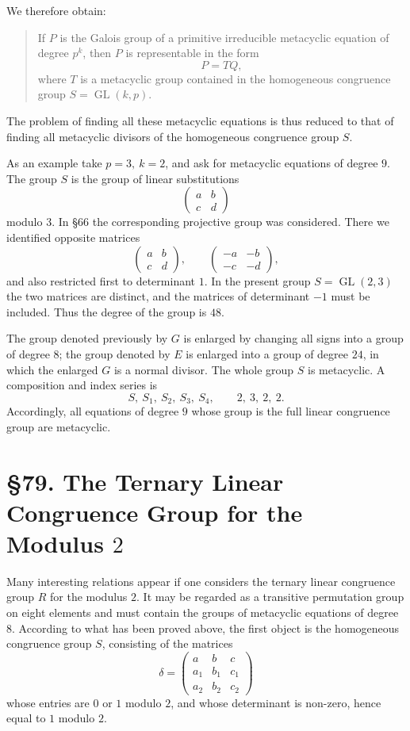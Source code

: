 \documentclass[11pt,a4paper]{book}
\newcommand{\webersection}[2]{\clearpage\section*{\S #1. #2}}
\DeclareMathOperator{\GL}{GL}
\begin{document}
We therefore obtain:

\begin{quote}
If \(P\) is the Galois group of a primitive irreducible metacyclic equation of degree \(p^k\), then \(P\) is representable in the form
\[
 P=TQ,
\]
where \(T\) is a metacyclic group contained in the homogeneous congruence group \(S=\GL(k,p)\).
\end{quote}

The problem of finding all these metacyclic equations is thus reduced to that of finding all metacyclic divisors of the homogeneous congruence group \(S\).

As an example take \(p=3,\ k=2\), and ask for metacyclic equations of degree \(9\).  The group \(S\) is the group of linear substitutions
\[
 \begin{pmatrix}a&b\\ c&d\end{pmatrix}
\]
modulo \(3\).  In \S 66 the corresponding projective group was considered.  There we identified opposite matrices
\[
 \begin{pmatrix}a&b\\ c&d\end{pmatrix},
 \qquad
 \begin{pmatrix}-a&-b\\ -c&-d\end{pmatrix},
\]
and also restricted first to determinant \(1\).  In the present group \(S=\GL(2,3)\) the two matrices are distinct, and the matrices of determinant \(-1\) must be included.  Thus the degree of the group is \(48\).

The group denoted previously by \(G\) is enlarged by changing all signs into a group of degree \(8\); the group denoted by \(E\) is enlarged into a group of degree \(24\), in which the enlarged \(G\) is a normal divisor.  The whole group \(S\) is metacyclic.  A composition and index series is
\[
 S,\ S_1,\ S_2,\ S_3,\ S_4,
 \qquad
 2,\ 3,\ 2,\ 2.
\]
Accordingly, all equations of degree \(9\) whose group is the full linear congruence group are metacyclic.

\webersection{79}{The Ternary Linear Congruence Group for the Modulus \(2\)}

Many interesting relations appear if one considers the ternary linear congruence group \(R\) for the modulus \(2\).  It may be regarded as a transitive permutation group on eight elements and must contain the groups of metacyclic equations of degree \(8\).  According to what has been proved above, the first object is the homogeneous congruence group \(S\), consisting of the matrices
\[
 \delta=
 \begin{pmatrix}
 a&b&c\\
 a_1&b_1&c_1\\
 a_2&b_2&c_2
 \end{pmatrix}
\]
whose entries are \(0\) or \(1\) modulo \(2\), and whose determinant is non-zero, hence equal to \(1\) modulo \(2\).
\end{document}
